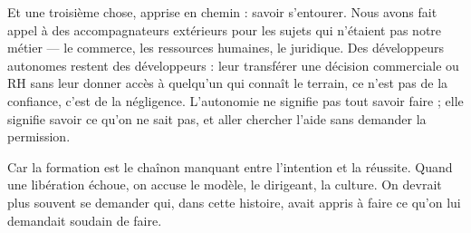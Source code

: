Et une troisième chose, apprise en chemin : savoir s'entourer. Nous avons fait appel à des accompagnateurs extérieurs pour les sujets qui n'étaient pas notre métier — le commerce, les ressources humaines, le juridique. Des développeurs autonomes restent des développeurs : leur transférer une décision commerciale ou RH sans leur donner accès à quelqu'un qui connaît le terrain, ce n'est pas de la confiance, c'est de la négligence. L'autonomie ne signifie pas tout savoir faire ; elle signifie savoir ce qu'on ne sait pas, et aller chercher l'aide sans demander la permission.

Car la formation est le chaînon manquant entre l'intention et la réussite. Quand une libération échoue, on accuse le modèle, le dirigeant, la culture. On devrait plus souvent se demander qui, dans cette histoire, avait appris à faire ce qu'on lui demandait soudain de faire.
